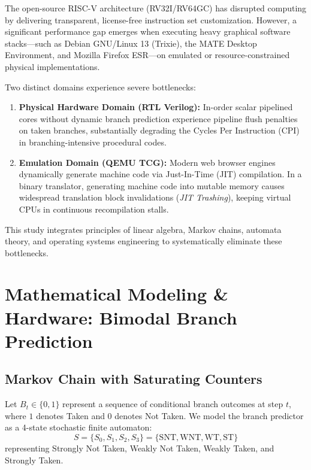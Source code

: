 \documentclass[10pt,twocolumn]{article}
\begin{document}
The open-source RISC-V architecture (RV32I/RV64GC) has disrupted computing by delivering transparent, license-free instruction set customization. However, a significant performance gap emerges when executing heavy graphical software stacks---such as Debian GNU/Linux 13 (Trixie), the MATE Desktop Environment, and Mozilla Firefox ESR---on emulated or resource-constrained physical implementations.

Two distinct domains experience severe bottlenecks:

\begin{enumerate}
    \item \textbf{Physical Hardware Domain (RTL Verilog):} In-order scalar pipelined cores without dynamic branch prediction experience pipeline flush penalties on taken branches, substantially degrading the Cycles Per Instruction (CPI) in branching-intensive procedural codes.
    \item \textbf{Emulation Domain (QEMU TCG):} Modern web browser engines dynamically generate machine code via Just-In-Time (JIT) compilation. In a binary translator, generating machine code into mutable memory causes widespread translation block invalidations (\textit{JIT Trashing}), keeping virtual CPUs in continuous recompilation stalls.
\end{enumerate}

This study integrates principles of linear algebra, Markov chains, automata theory, and operating systems engineering to systematically eliminate these bottlenecks.

\section{Mathematical Modeling \& Hardware: Bimodal Branch Prediction}

\subsection{Markov Chain with Saturating Counters}

Let $B_t \in \{0, 1\}$ represent a sequence of conditional branch outcomes at step $t$, where $1$ denotes Taken and $0$ denotes Not Taken. We model the branch predictor as a 4-state stochastic finite automaton:
\begin{equation}
S = \{S_0, S_1, S_2, S_3\} = \{\text{SNT}, \text{WNT}, \text{WT}, \text{ST}\}
\end{equation}
representing Strongly Not Taken, Weakly Not Taken, Weakly Taken, and Strongly Taken.
\end{document}
